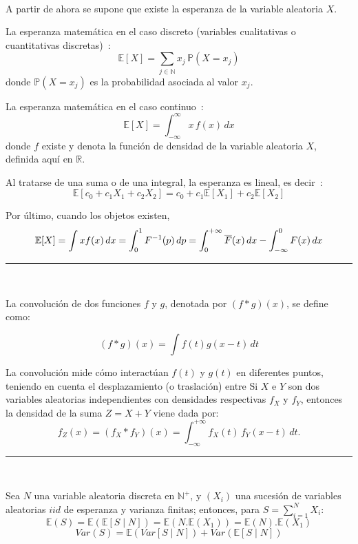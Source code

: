 \begin{f}[Esperanza]{\ }
	
	A partir de ahora se supone que existe la esperanza de la variable aleatoria \(X\).
	
	La esperanza matemática en el caso discreto (variables cualitativas o cuantitativas discretas)~:
	\[
	\mathbb{E}[X]=\sum_{j\in \mathbb{N}} x_j\,\mathbb{P}(X=x_j)
	\]
	donde \(\mathbb{P}(X=x_j)\) es la probabilidad asociada al valor \(x_j\).
	
	La esperanza matemática en el caso continuo~:
	\[
	\mathbb{E}[X]=\int_{-\infty}^{\infty} x\, f(x)\,dx
	\]
	donde \(f\) existe y denota la función de densidad de la variable aleatoria \(X\), definida aquí en \(\mathbb{R}\).
	
	Al tratarse de una suma o de una integral, la esperanza es lineal, es decir~:
	\[
	\mathbb{E}\left[c_0+c_1X_1+c_2X_2\right]=c_0+c_1\mathbb{E}[X_1]+c_2\mathbb{E}[X_2]
	\]
	
	Por último, cuando los objetos existen,
	\[\small
	\mathbb{E}[X]=\int x f(x)\,dx
	= \int_0^1 F^{-1}(p)\,dp
	= \int_{0}^{+\infty} \overline{F}(x)\,dx -\int_{-\infty}^{0}  F(x)\,dx
	\]
\end{f}
\hrule
\begin{f}{\ }
	
	La convolución de dos funciones \( f \) y \( g \), denotada por \( (f * g)(x) \), se define como:
	
	\[
	(f * g)(x) = \int f(t) g(x - t) \, dt
	\]
	
	La convolución mide cómo interactúan \( f(t) \) y \( g(t) \) en diferentes puntos, teniendo en cuenta el desplazamiento (o traslación) entre 
Si \(X\) e \(Y\) son dos variables aleatorias independientes con densidades respectivas \(f_X\) y \(f_Y\), entonces la densidad de la suma \(Z = X + Y\) viene dada por:
	\[
	f_Z(x) = (f_X * f_Y)(x) = \int_{-\infty}^{+\infty} f_X(t)\, f_Y(x - t)\, dt.
	\]
	
\end{f}
\hrule
\begin{f}
	{\ }

	Sea \(N\) una variable aleatoria discreta en \(\mathbb{N}^+\), y \(\left(X_i\right)\) una sucesión de variables aleatorias \(iid\) de esperanza y varianza finitas; entonces, para  \(\displaystyle S=\sum_{i=1}^{N}X_i\):
	\[
	\mathbb{E}(S) = \mathbb{E} (\mathbb{E} [S \mid N]) = \mathbb{E} (N.\mathbb{E}(X_1)) = \mathbb{E}(N).\mathbb{E}(X_1)
	\]
	\[
	Var (S) = \mathbb{E} (Var [S \mid N]) + Var (\mathbb{E} [S \mid N])
	\]
\end{f}

